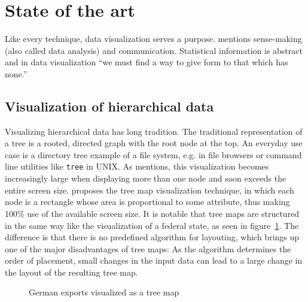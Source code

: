\documentclass{article}
\begin{document}
\newpage

\section{State of the art}
Like every technique, data visualization serves a purpose.
\textcite{Few2013} mentions sense-making (also called data analysis) and communication.
Statistical information is abstract and in data visualization ``we must find a way to give form to that which has none.''\cite{Few2013}



\subsection{Visualization of hierarchical data}
Visualizing hierarchical data has long tradition.
The traditional representation of a tree is a rooted, directed graph with the root node at the top.
An everyday use case is a directory tree example of a file system, e.g. in file browsers or command line utilities like \texttt{tree} in UNIX.
As \textcite{Shneiderman1992} mentions, this visualization becomes increasingly large when displaying more than one node and soon exceeds the entire screen size.
\textcite{Johnson1991} proposes the tree map visualization technique, in which each node is a rectangle whose area is proportional to some attribute, thus making 100\% use of the available screen size.
It is notable that tree maps are structured in the same way like the visualization of a federal state, as seen in figure~\ref{fig:research:treemap}.
The difference is that there is no predefined algorithm for layouting, which brings up one of the major disadvantages of tree maps:
As the algorithm determines the order of placement, small changes in the input data can lead to a large change in the layout of the resulting tree map.

\begin{figure}[h]
\centering
\caption{German exports visualized as a tree map}
\label{fig:research:treemap}
\end{figure}
\end{document}
